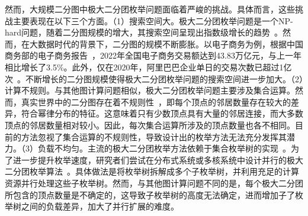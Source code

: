 
然而，大规模二分图中极大二分团枚举问题面临着严峻的挑战。具体而言，这些挑战主要表现在以下三个方面。（1）搜索空间大。极大二分团枚举问题是一个NP-hard问题，随着二分图规模的增大，其搜索空间呈现出指数级增长的趋势~\cite{MICA04}。然而，在大数据时代的背景下，二分图的规模不断膨胀。以电子商务为例，根据中国商务部的电子商务报告~\cite{ECommerceReport}，2022年全国电子商务交易额达到43.83万亿元，与上一年相比增长了3.5\%。此外，仅在2020年，阿里巴巴企业单日的交易次数已超过1亿次~\cite{MEB20}。不断增长的二分图规模使得极大二分团枚举问题的搜索空间进一步加大。（2）计算不规则。与其他图计算问题相似，极大二分团枚举问题主要涉及集合运算。然而，真实世界中的二分图存在着不规则性~\cite{Irregularity12}，即每个顶点的邻居数量存在较大的差异，符合幂律分布的特征。这意味着只有少数顶点具有大量的邻居连接，而大多数顶点的邻居数量相对较小。因此，每次集合运算所涉及的顶点数量也各不相同。目前的方法忽视了集合运算的不规则性，导致设计出的枚举方法无法充分发挥其潜力。（3）负载不均匀。主流的极大二分团枚举方法依赖于集合枚举树的实现~\cite{minel06,iMBEA14,PMBE20,ooMBE22}。为了进一步提升枚举速度，研究者们尝试在分布式系统或多核系统中设计并行的极大二分团枚举算法~\cite{mapreduceMBE16,parMBE18}。具体做法是将枚举树拆解成多个子枚举树，并利用充足的计算资源并行处理这些子枚举树。然而，与其他图计算问题不同的是，每个极大二分团所包含的顶点数量是不确定的，这导致子枚举树的高度无法确定，进而增加子了枚举树之间的负载差异，加大了并行扩展的难度。




